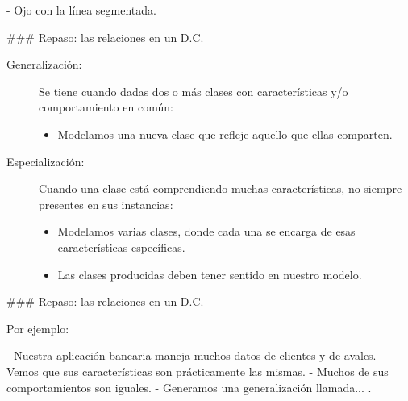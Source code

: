\begin{center}
\end{center}

- Ojo con la línea segmentada.

### Repaso: las relaciones en un D.C.


\begin{description}
    \item[Generalización:] Se tiene cuando dadas dos o más clases con características y/o comportamiento en común:
    \begin{itemize}
        \item Modelamos una nueva clase que refleje aquello que ellas comparten.
    \end{itemize}
\vfill
    \item[Especialización:] Cuando una clase está comprendiendo muchas características, no siempre presentes en sus instancias:
    \begin{itemize}
        \item Modelamos varias clases, donde cada una se encarga de esas características específicas.
        \item Las clases producidas deben tener sentido en nuestro modelo.
    \end{itemize}
\end{description}

### Repaso: las relaciones en un D.C.


Por ejemplo:

- Nuestra aplicación bancaria maneja muchos datos de clientes y de avales.
    - Vemos que sus características son prácticamente las mismas.
    - Muchos de sus comportamientos son iguales.
    - Generamos una generalización llamada... .

